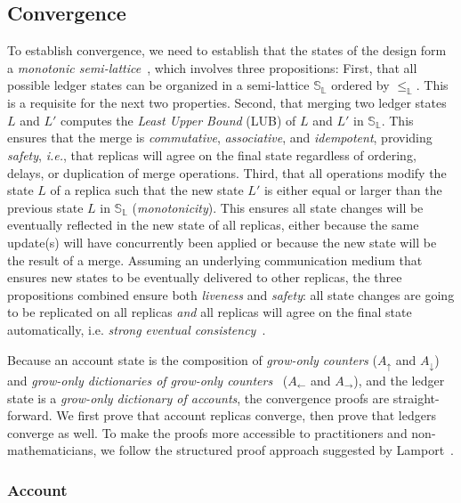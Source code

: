 \documentclass[9pt, oneside]{article}   	%
\begin{document}
\subsection{Convergence}

To establish convergence, we need to establish that the states of the design form a \textit{monotonic semi-lattice}~\cite{shapiro:hal-00932836}, which involves three propositions: First, that all possible ledger states can be organized in a semi-lattice $\mathds{S}_\mathds{L}$ ordered by $\leq_\mathds{L}$. This is a requisite for the next two properties. Second, that merging two ledger states $L$ and $L'$ computes the \textit{Least Upper Bound} (LUB) of $L$ and $L'$ in $\mathds{S}_\mathds{L}$. This ensures that the merge is \textit{commutative}, \textit{associative}, and \textit{idempotent}, providing \textit{safety}, \textit{i.e.}, that replicas will agree on the final state regardless of ordering, delays, or duplication of merge operations. Third, that all operations modify the state $L$ of a replica such that the new state $L'$ is either equal or larger than the previous state $L$ in $\mathds{S}_\mathds{L}$ (\textit{monotonicity}). This ensures all state changes will be eventually reflected in the new state of all replicas, either because the same update(s) will have concurrently been applied or because the new state will be the result of a merge. Assuming an underlying communication medium that ensures new states to be eventually delivered to other replicas, the three propositions combined ensure both \textit{liveness} and \textit{safety}: all state changes are going to be replicated on all replicas \textit{and} all replicas will agree on the final state automatically, i.e. \textit{strong eventual consistency}~\cite{shapiro:hal-00932836}.

Because an account state is the composition of \textit{grow-only counters} ($A_\uparrow$ and $A_\downarrow$) and \textit{grow-only dictionaries of grow-only counters}~\cite{lavoie2023statebased} ($A_\leftarrow$ and $A_\rightarrow$), and the ledger state is a \textit{grow-only dictionary of accounts}, the convergence proofs are straight-forward. We first prove that account replicas converge, then prove that ledgers converge as well. To make the proofs more accessible to practitioners and non-mathematicians, we follow the structured proof approach suggested by Lamport~\cite{lamport2012write}.

\subsubsection{Account}
\label{sec:proof:account}
\end{document}
